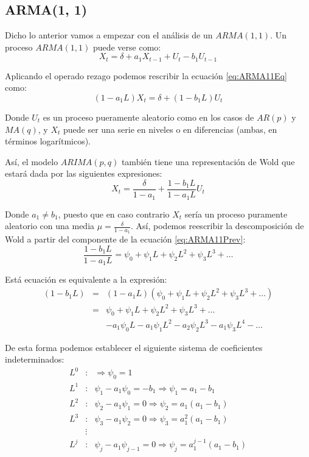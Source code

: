 \documentclass[
]{book}
\begin{document}
\hypertarget{arma1-1}{%
\subsection{ARMA(1, 1)}\label{arma1-1}}

Dicho lo anterior vamos a empezar con el análisis de un \(ARMA(1, 1)\). Un proceso \(ARMA(1, 1)\) puede verse como:
\begin{equation}
    X_t = \delta + a_1 X_{t - 1} + U_t - b_1 U_{t - 1}
    \label{eq:ARMA11Eq}
\end{equation}

Aplicando el operado rezago podemos rescribir la ecuación \eqref{eq:ARMA11Eq} como:
\begin{equation}
    (1 - a_1 L) X_t = \delta + (1 - b_1 L) U_t
\end{equation}

Donde \(U_t\) es un proceso pueramente aleatorio como en los casos de \(AR(p)\) y \(MA(q)\), y \(X_t\) puede ser una serie en niveles o en diferencias (ambas, en términos logarítmicos).

Así, el modelo \(ARIMA (p, q)\) también tiene una representación de Wold que estará dada por las siguientes expresiones:
\begin{equation}
    X_t = \frac{\delta}{1 - a_1} + \frac{1 - b_1 L}{1 - a_1 L} U_t
    \label{eq:ARMA11Prev}
\end{equation}

Donde \(a_1 \neq b_1\), puesto que en caso contrario \(X_t\) sería un proceso puramente aleatorio con una media \(\mu = \frac{\delta}{1 - a_1}\). Así, podemos reescribir la descomposición de Wold a partir del componente de la ecuación \eqref{eq:ARMA11Prev}:
\begin{equation}
    \frac{1 - b_1 L}{1 - a_1 L} = \psi_0 + \psi_1 L + \psi_2 L^2 + \psi_3 L^3 + \ldots 
    \label{eq:ARMA11EqWold}
\end{equation}

Está ecuación es equivalente a la expresión:
\begin{eqnarray}
    (1 - b_1 L) & = & (1 - a_1 L)(\psi_0 + \psi_1 L + \psi_2 L^2 + \psi_3 L^3 + \ldots) \nonumber \\
    & = & \psi_0 + \psi_1 L + \psi_2 L^2 + \psi_3 L^3 + \ldots \nonumber \\
    &   & - a_1 \psi_0 L - a_1 \psi_1 L^2 - a_2 \psi_2 L^3 - a_1 \psi_3 L^4 - \ldots \nonumber
\end{eqnarray}

De esta forma podemos establecer el siguiente sistema de coeficientes indeterminados:
\begin{eqnarray*}
    L^0 & : & \Rightarrow \psi_0 = 1 \\
    L^1 & : & \psi_1 - a_1 \psi_0 = - b_1 \Rightarrow \psi_1 = a_1 - b_1 \\
    L^2 & : & \psi_2 - a_1 \psi_1 = 0 \Rightarrow \psi_2 = a_1(a_1 - b_1) \\
    L^3 & : & \psi_3 - a_1 \psi_2 = 0 \Rightarrow \psi_3 = a^2_1(a_1 - b_1) \\
     & \vdots &  \\
    L^j & : & \psi_j - a_1 \psi_{j - 1} = 0 \Rightarrow \psi_j = a^{j - 1}_1(a_1 - b_1)
\end{eqnarray*}
\end{document}
